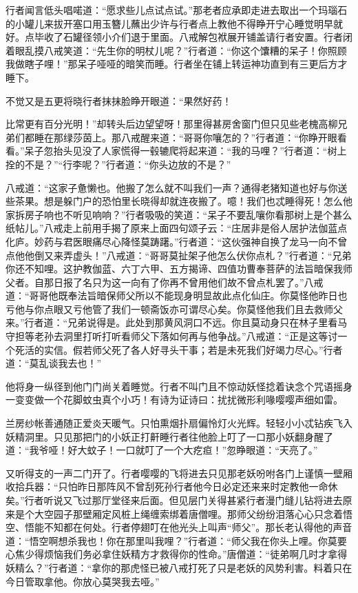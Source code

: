 \documentclass[12pt,UTF8]{ctexbook}
\begin{document}
{行者闻言低头唱喏道：“愿求些儿点试点试。”那老者应承即走进去取出一个玛瑙石的小罐儿来拔开塞口用玉簪儿蘸出少许与行者点上教他不得睁开宁心睡觉明早就好。点毕收了石罐径领小介们退于里面。八戒解包袱展开铺盖请行者安置。行者闭着眼乱摸八戒笑道：“先生你的明杖儿呢？”行者道：“你这个馕糟的呆子！你照顾我做瞎子哩！”那呆子哑哑的暗笑而睡。行者坐在铺上转运神功直到有三更后方才睡下。

不觉又是五更将晓行者抹抹脸睁开眼道：“果然好药！

比常更有百分光明！”却转头后边望望呀！那里得甚房舍窗门但只见些老槐高柳兄弟们都睡在那绿莎茵上。那八戒醒来道：“哥哥你嚷怎的？”行者道：“你睁开眼看看。”呆子忽抬头见没了人家慌得一毂辘爬将起来道：“我的马哩？”行者道：“树上拴的不是？”“行李呢？”行者道：“你头边放的不是？”

八戒道：“这家子惫懒也。他搬了怎么就不叫我们一声？通得老猪知道也好与你送些茶果。想是躲门户的恐怕里长晓得却就连夜搬了。噫！我们也忒睡得死！怎么他家拆房子响也不听见响响？”行者吸吸的笑道：“呆子不要乱嚷你看那树上是个甚么纸帖儿。”八戒走上前用手揭了原来上面四句颂子云：“庄居非是俗人居护法伽蓝点化庐。妙药与君医眼痛尽心降怪莫踌躇。”行者道：“这伙强神自换了龙马一向不曾点他他倒又来弄虚头！”八戒道：“哥哥莫扯架子他怎么伏你点札？”行者道：“兄弟你还不知哩。这护教伽蓝、六丁六甲、五方揭谛、四值功曹奉菩萨的法旨暗保我师父者。自那日报了名只为这一向有了你再不曾用他们故不曾点札罢了。”八戒道：“哥哥他既奉法旨暗保师父所以不能现身明显故此点化仙庄。你莫怪他昨日也亏他与你点眼又亏他管了我们一顿斋饭亦可谓尽心矣。你莫怪他我们且去救师父来。”行者道：“兄弟说得是。此处到那黄风洞口不远。你且莫动身只在林子里看马守担等老孙去洞里打听打听看师父下落如何再与他争战。”八戒道：“正是这等讨一个死活的实信。假若师父死了各人好寻头干事；若是未死我们好竭力尽心。”行者道：“莫乱谈我去也！”

他将身一纵径到他门门尚关着睡觉。行者不叫门且不惊动妖怪捻着诀念个咒语摇身一变变做一个花脚蚊虫真个小巧！有诗为证诗曰：扰扰微形利喙嘤嘤声细如雷。

兰房纱帐善通随正爱炎天暖气。只怕熏烟扑扇偏怜灯火光辉。轻轻小小忒钻疾飞入妖精洞里。只见那把门的小妖正打鼾睡行者往他脸上叮了一口那小妖翻身醒了道：“我爷哑！好大蚊子！一口就叮了一个大疙疸！”忽睁眼道：“天亮了。”

又听得支的一声二门开了。行者嘤嘤的飞将进去只见那老妖吩咐各门上谨慎一壁厢收拾兵器：“只怕昨日那阵风不曾刮死孙行者他今日必定还来来时定教他一命休矣。”行者听说又飞过那厅堂径来后面。但见层门关得甚紧行者漫门缝儿钻将进去原来是个大空园子那壁厢定风桩上绳缠索绑着唐僧哩。那师父纷纷泪落心心只念着悟空、悟能不知都在何处。行者停翅叮在他光头上叫声“师父”。那长老认得他的声音道：“悟空啊想杀我也！你在那里叫我哩？”行者道：“师父我在你头上哩。你莫要心焦少得烦恼我们务必拿住妖精方才救得你的性命。”唐僧道：“徒弟啊几时才拿得妖精么？”行者道：“拿你的那虎怪已被八戒打死了只是老妖的风势利害。料着只在今日管取拿他。你放心莫哭我去哑。”

}
\end{document}
